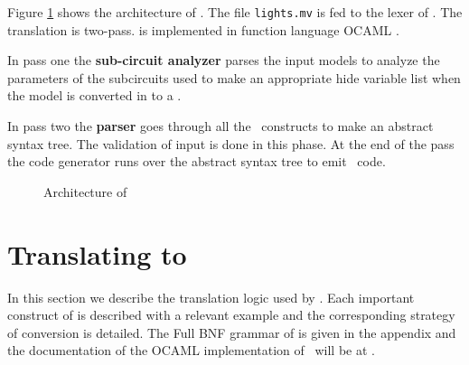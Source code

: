 Figure \ref{fig:mv2rmarch} shows the architecture of \mvrm . The
file {\tt lights.mv} is fed to the lexer of {\mvrm }. The
translation is two-pass. {\mvrm } is implemented in function
language OCAML \cite{ocaml}.

In pass one the \textbf{sub-circuit analyzer} parses the input
models {\mv } to analyze the parameters of the subcircuits used to
make an appropriate hide variable list when the model is converted
in to a {\rm }.

In pass two the \textbf{parser} goes through all the \mv \
constructs to make an abstract syntax tree. The validation of
input is done in this phase. At the end of the pass the code
generator runs over the abstract syntax tree to emit \rm \ code.

\begin{figure}[htbp]
\centering {}
\caption{Architecture of {\mvrm} } \label{fig:mv2rmarch}
\end{figure}


\section{Translating {\mv } to {\rm }}
In this section we describe the translation logic used by
{\mvrm}. Each important construct of {\mv } is described with a
relevant example and the corresponding strategy of conversion is
detailed.  The Full BNF grammar of {\mv } is given in the appendix and
the documentation of the OCAML implementation of \mvrm \ will be at
\cite{mv2rmdoc}.

